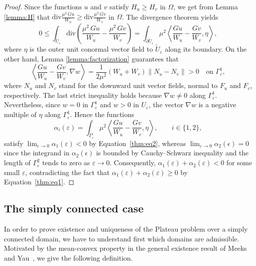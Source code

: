 \documentclass[a4paper,10pt,reqno]{amsart}
\theoremstyle{definition}
\theoremstyle{remark}
\numberwithin{equation}{section}
\begin{document}
\begin{proof}
Since the functions $u$ and $v$ satisfy $H_u\geq H_v$ in $\Omega$, we get from Lemma \ref{lemma:H} that $\mathrm{div}\frac{\mu^2\, Gu}{W_u}\geq \mathrm{div}\frac{\mu^2\, Gv}{W_v}$ in $\Omega$. The divergence theorem yields
\begin{equation}\label{thm:eq1}
	0\leq\int_{\widetilde{U}_\varepsilon}\mathrm{div}\left(\frac{\mu^2\, Gu}{W_u}-\frac{\mu^2\, Gv}{W_v}\right)=\int_{\partial\widetilde{U}_\varepsilon}\mu^2\left\langle\frac{Gu}{W_u}-\frac{Gv}{W_v},\eta\right\rangle,
\end{equation}
where $\eta$ is the outer unit conormal vector field to $\widetilde{U}_\varepsilon$ along its boundary. On the other hand, Lemma \ref{lemma:factorization} guarantees that
\begin{equation}\label{thm:eq2}
	\left\langle\frac{Gu}{W_u}-\frac{Gv}{W_v},\nabla w\right\rangle=\frac{1}{2\mu^2}(W_u+W_v)\|N_u-N_v\|>0\quad\text{on }\Gamma^1_\varepsilon,
\end{equation}
where $N_u$ and $N_v$ stand for the downward unit vector fields, normal to $F_u$ and $F_v$, respectively. The last strict inequality holds because $\nabla w\neq 0$ along $\Gamma^1_\varepsilon$. Nevertheless, since $w=0$ in $\Gamma^1_\varepsilon$ and $w>0$ in $U_\varepsilon$, the vector $\nabla w$ is a negative multiple of $\eta$ along $\Gamma^1_\varepsilon$. Hence the functions
\begin{equation}\label{thm:eq3}
\alpha_i(\varepsilon)=\int_{\Gamma^i_\varepsilon}\mu^2\left\langle\frac{Gu}{W_u}-\frac{Gv}{W_v},\eta\right\rangle,\qquad i\in\{1,2\},
\end{equation}
satisfy $\lim_{\varepsilon\to 0}\alpha_1(\varepsilon)<0$ by Equation~\eqref{thm:eq2}, whereas $\lim_{\varepsilon\to0}\alpha_2(\epsilon)=0$ since the integrand in $\alpha_2(\epsilon)$ is bounded by Cauchy--Schwarz inequality and the length of $\Gamma^2_\varepsilon$ tends to zero as $\varepsilon\to 0$. Consequently, $\alpha_1(\varepsilon)+\alpha_2(\varepsilon)<0$ for some small $\varepsilon$, contradicting the fact that $\alpha_1(\varepsilon)+\alpha_2(\varepsilon)\geq 0$ by Equation~\eqref{thm:eq1}.
\end{proof}

\subsection{The simply connected case}
In order to prove existence and uniqueness of the Plateau problem over a simply connected domain, we have to understand first which domains are admissible. Motivated by the mean-convex property in the general existence result of Meeks and Yau~\cite{MY1}, we give the following definition.
\end{document}
